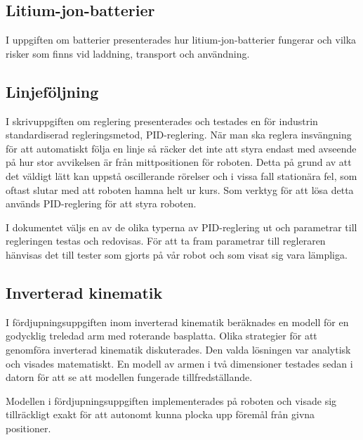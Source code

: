 \subsection{Litium-jon-batterier}

I uppgiften om batterier presenterades hur litium-jon-batterier fungerar och vilka risker som finns vid laddning, transport och användning. 

\subsection{Linjeföljning}

I skrivuppgiften om reglering presenterades och testades en för industrin standardiserad regleringsmetod, PID-reglering. När man ska reglera insvängning för att automatiskt följa en linje så räcker det inte att styra endast med avseende på hur stor avvikelsen är från mittpositionen för roboten. Detta på grund av att det väldigt lätt kan uppstå oscillerande rörelser och i vissa fall stationära fel, som oftast slutar med att roboten hamna helt ur kurs. Som verktyg för att lösa detta används PID-reglering för att styra roboten.

I dokumentet väljs en av de olika typerna av PID-reglering ut och parametrar till regleringen testas och redovisas. För att ta fram parametrar till regleraren hänvisas det till tester som gjorts på vår robot och som visat sig vara lämpliga.

\subsection{Inverterad kinematik}
I fördjupningsuppgiften inom inverterad kinematik beräknades en modell för en godycklig treledad arm med roterande basplatta. Olika strategier för att genomföra inverterad kinematik diskuterades. Den valda lösningen var analytisk och visades matematiskt. En modell av armen i två dimensioner testades sedan i datorn för att se att modellen fungerade tillfredställande.

Modellen i fördjupningsuppgiften implementerades på roboten och visade sig tillräckligt exakt för att autonomt kunna plocka upp föremål från givna positioner.